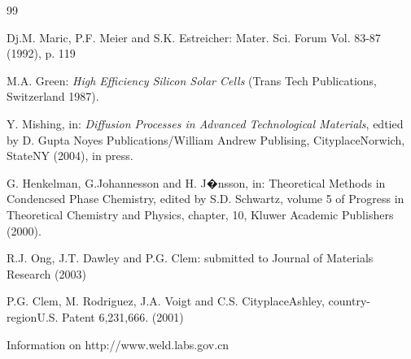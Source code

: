 \documentclass{TTP}
\begin{document}
\begin{thebibliography}{99}

 Dj.M. Maric, P.F. Meier and S.K. Estreicher: Mater. Sci. Forum Vol. 83-87 (1992), p. 119

 M.A. Green: \textit{High Efficiency Silicon Solar Cells }(Trans Tech Publications, Switzerland 1987).

 Y. Mishing, in: \textit{Diffusion Processes in Advanced Technological Materials}, 
edtied by D. Gupta Noyes Publications/William Andrew Publising, CityplaceNorwich, StateNY (2004), in press.

 G. Henkelman, G.Johannesson and H. J�nsson, in: Theoretical Methods in Condencsed 
Phase Chemistry, edited by S.D. Schwartz, volume 5 of Progress in Theoretical Chemistry and Physics, chapter, 
10, Kluwer Academic Publishers (2000).

 R.J. Ong, J.T. Dawley and P.G. Clem: submitted to Journal of Materials Research (2003) 

 P.G. Clem, M. Rodriguez, J.A. Voigt and C.S. CityplaceAshley, country-regionU.S. Patent 6,231,666. (2001)

  Information on http://www.weld.labs.gov.cn

\end{thebibliography}
\end{document}
